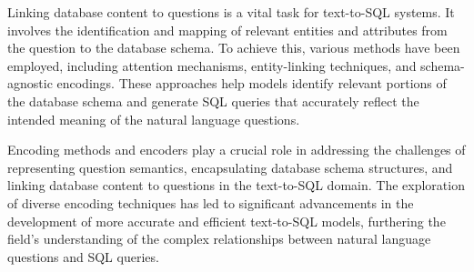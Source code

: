 Linking database content to questions is a vital task for text-to-SQL systems\cite{deng2022recent}. It involves the identification and mapping of relevant entities and attributes from the question to the database schema. To achieve this, various methods have been employed, including attention mechanisms, entity-linking techniques, and schema-agnostic encodings. These approaches help models identify relevant portions of the database schema and generate SQL queries that accurately reflect the intended meaning of the natural language questions.

Encoding methods and encoders play a crucial role in addressing the challenges of representing question semantics, encapsulating database schema structures, and linking database content to questions in the text-to-SQL domain. The exploration of diverse encoding techniques has led to significant advancements in the development of more accurate and efficient text-to-SQL models, furthering the field's understanding of the complex relationships between natural language questions and SQL queries\cite{deng2022recent}.

